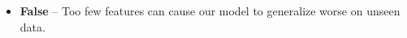 \begin{itemize}
    \item[] {\bf False} -- Too few features can cause our model to generalize worse on unseen data.
\end{itemize}

